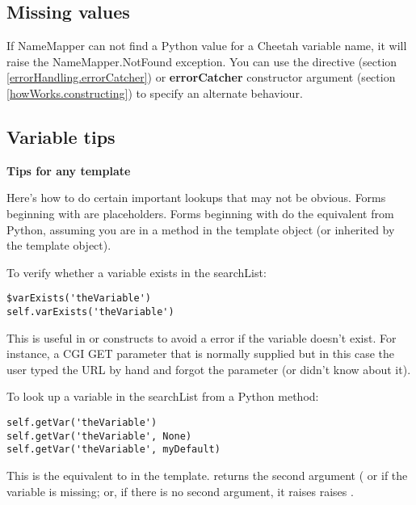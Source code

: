 \subsection{Missing values}
\label{language.namemapper.missing}

If NameMapper can not find a Python value for a Cheetah variable name, it will
raise the NameMapper.NotFound exception.  You can use the 
directive (section \ref{errorHandling.errorCatcher}) or {\bf errorCatcher }
constructor argument (section \ref{howWorks.constructing}) to specify an
alternate behaviour.


\subsection{Variable tips}
\label{language.namemapper.tips}


{\bf Tips for any template}

Here's how to do certain important lookups that may not be obvious.
Forms beginning with \code{\$} are placeholders.  Forms beginning with
 do the equivalent from Python, assuming you are in a method in
the template object (or inherited by the template object).

To verify whether a variable exists in the searchList:
\begin{verbatim}
$varExists('theVariable')
self.varExists('theVariable')
\end{verbatim}
This is useful in  or  constructs to avoid a
 error if the variable doesn't exist.  For instance,
a CGI GET parameter that is normally supplied but in this case the user typed
the URL by hand and forgot the parameter (or didn't know about it).

To look up a variable in the searchList from a Python method:
\begin{verbatim}
self.getVar('theVariable')
self.getVar('theVariable', None)
self.getVar('theVariable', myDefault)
\end{verbatim}
This is the equivalent to  in the template.  
returns the second argument ( or  if the variable is
missing; or, if there is no second argument, it raises raises
.

